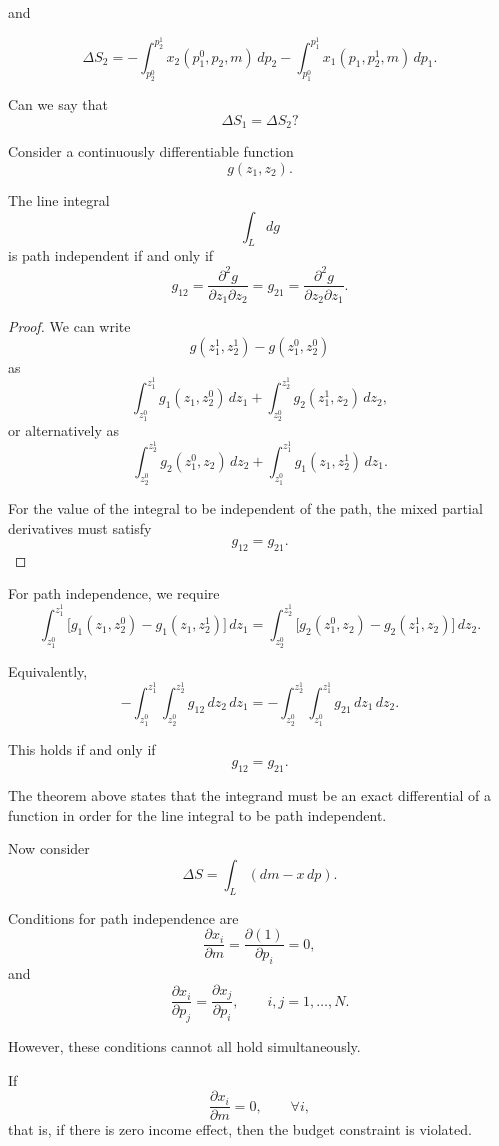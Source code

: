 and

\[
\Delta S_2
=
-
\int_{p_2^0}^{p_2^1}
x_2(p_1^0,p_2,m)\,dp_2
-
\int_{p_1^0}^{p_1^1}
x_1(p_1,p_2^1,m)\,dp_1.
\]

Can we say that
\[
\Delta S_1=\Delta S_2?
\]

\begin{theorem}
Consider a continuously differentiable function
\[
g(z_1,z_2).
\]

The line integral
\[
\int_L dg
\]
is path independent if and only if
\[
g_{12}
=
\frac{\partial^2 g}{\partial z_1\partial z_2}
=
g_{21}
=
\frac{\partial^2 g}{\partial z_2\partial z_1}.
\]
\end{theorem}

\begin{proof}
We can write
\[
g(z_1^1,z_2^1)-g(z_1^0,z_2^0)
\]
as
\[
\int_{z_1^0}^{z_1^1}
g_1(z_1,z_2^0)\,dz_1
+
\int_{z_2^0}^{z_2^1}
g_2(z_1^1,z_2)\,dz_2,
\]
or alternatively as
\[
\int_{z_2^0}^{z_2^1}
g_2(z_1^0,z_2)\,dz_2
+
\int_{z_1^0}^{z_1^1}
g_1(z_1,z_2^1)\,dz_1.
\]

For the value of the integral to be independent of the path, the mixed partial derivatives must satisfy
\[
g_{12}=g_{21}.
\]
\end{proof}



For path independence, we require
\[
\int_{z_1^0}^{z_1^1}
\bigl[
g_1(z_1,z_2^0)-g_1(z_1,z_2^1)
\bigr]
\,dz_1
=
\int_{z_2^0}^{z_2^1}
\bigl[
g_2(z_1^0,z_2)-g_2(z_1^1,z_2)
\bigr]
\,dz_2.
\]

Equivalently,
\[
-
\int_{z_1^0}^{z_1^1}
\int_{z_2^0}^{z_2^1}
g_{12}
\,dz_2\,dz_1
=
-
\int_{z_2^0}^{z_2^1}
\int_{z_1^0}^{z_1^1}
g_{21}
\,dz_1\,dz_2.
\]

This holds if and only if
\[
g_{12}=g_{21}.
\]

The theorem above states that the integrand must be an exact differential of a function in order for the line integral to be path independent.

Now consider
\[
\Delta S
=
\int_L (dm-x\,dp).
\]

Conditions for path independence are
\[
\frac{\partial x_i}{\partial m}
=
\frac{\partial (1)}{\partial p_i}
=
0,
\]
and
\[
\frac{\partial x_i}{\partial p_j}
=
\frac{\partial x_j}{\partial p_i},
\qquad
i,j=1,\dots,N.
\]

However, these conditions cannot all hold simultaneously.

If
\[
\frac{\partial x_i}{\partial m}=0,
\qquad
\forall i,
\]
that is, if there is zero income effect, then the budget constraint is violated.

